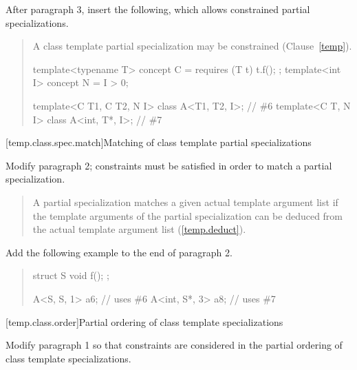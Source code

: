 After paragraph 3, insert the following, which allows constrained partial 
specializations.

\begin{quote}
\begin{addedblock}
\setcounter{Paras}{3}
\pnum
A class template partial specialization may be constrained
(Clause~\ref{temp}).
\enterexample
\begin{codeblock}
template<typename T> concept C = requires (T t) { t.f(); };
template<int I> concept N = I > 0;

template<C T1, C T2, N I> class A<T1, T2, I>;  // \#6
template<C T, N I>        class A<int, T*, I>; // \#7
\end{codeblock}
\exitexample
\end{addedblock}
\end{quote}

[temp.class.spec.match]{Matching of class template partial specializations}

Modify paragraph 2; constraints must be satisfied in order
to match a partial specialization. 

\begin{quote}
\setcounter{Paras}{1}
\pnum
A partial specialization matches a given actual template argument list if 
the template arguments of the partial specialization can be deduced from the 
actual template argument list (\ref{temp.deduct}).
\end{quote}

Add the following example to the end of paragraph 2.

\begin{quote}
\begin{addedblock}
\enterexample
\begin{codeblock}
struct S { void f(); };

A<S, S, 1>    a6; // uses \#6
A<int, S*, 3> a8; // uses \#7
\end{codeblock}
\exitexample
\end{addedblock}
\end{quote}


[temp.class.order]{Partial ordering of class template specializations}

Modify paragraph 1 so that constraints are considered in the
partial ordering of class template specializations. 

